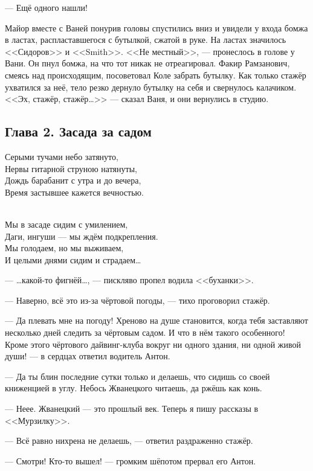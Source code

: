 --- Ещё одного нашли!

Майор вместе с Ваней понурив головы спустились вниз и увидели у входа бомжа в ластах, распластавшегося с бутылкой, сжатой в руке. На ластах значилось <<Сидоров>> и <<Smith>>. <<Не местный>>, --- пронеслось в голове у Вани. Он пнул бомжа, на что тот никак не отреагировал. Факир Рамзанович, смеясь над происходящим, посоветовал Коле забрать бутылку. Как только стажёр ухватился за неё, тело резко дернуло бутылку на себя и свернулось калачиком. <<Эх, стажёр, стажёр\ldots>> --- сказал Ваня, и они вернулись в студию.

\subsection*{Глава 2. Засада за садом}
\begin{center}
Серыми тучами небо затянуто,\\
Нервы гитарной струною натянуты,\\
Дождь барабанит с утра и до вечера,\\
Время застывшее кажется вечностью.

~\\
Мы в засаде сидим с умилением,\\
Даги, ингуши --- мы ждём подкрепления.\\
Мы голодаем, но мы выживаем,\\
И целыми днями сидим и страдаем\ldots
\end{center}

--- \ldots какой-то фигнёй\ldots, --- пискляво пропел водила <<буханки>>. 

--- Наверно, всё это из-за чёртовой погоды, --- тихо проговорил стажёр.

--- Да плевать мне на погоду! Хреново на душе становится, когда тебя заставляют несколько дней следить за чёртовым садом. И что в нём такого особенного! Кроме этого чёртового дайвинг-клуба вокруг ни одного здания, ни одной живой души! --- в сердцах ответил водитель Антон.

--- Да ты блин последние сутки только и делаешь, что сидишь со своей книженцией в углу. Небось Жванецкого читаешь, да ржёшь как конь.

--- Неее. Жванецкий --- это прошлый век. Теперь я пишу рассказы в <<Мурзилку>>.

--- Всё равно нихрена не делаешь, --- ответил раздраженно стажёр.

--- Смотри! Кто-то вышел! --- громким шёпотом прервал его Антон.

